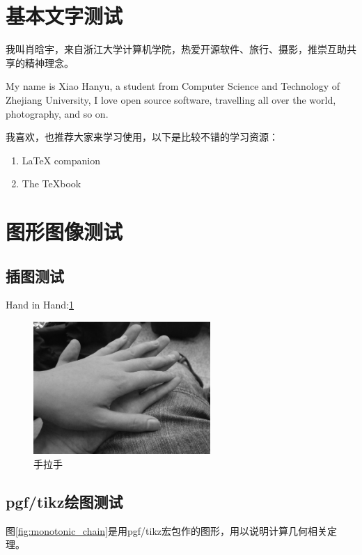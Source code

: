\section{基本文字测试}
\label{sec:1}
我叫肖晗宇，来自浙江大学计算机学院，热爱开源软件、旅行、摄影，推崇互助共享的精神理念。

My name is Xiao Hanyu, a student from Computer Science and Technology of Zhejiang University, I love open source software, travelling all over the world, photography, and so on. 

我喜欢\LaTeXe，也推荐大家来学习使用\LaTeXe，以下是比较不错的学习资源：

\begin{enumerate}
\item LaTeX companion
\item The TeXbook
\end{enumerate}


\section{图形图像测试}
\subsection{插图测试}
Hand in Hand:\ref{fig:hand_in_hand}
\begin{figure}[htbp]
\centerline{\includegraphics[width=0.6\textwidth]{images/hand_in_hand.png}}
\caption[]{\label{fig:hand_in_hand} 手拉手}
\end{figure}

\subsection{pgf/tikz绘图测试}
图\ref{fig:monotonic_chain}是用pgf/tikz宏包作的图形，用以说明计算几何相关定理。

